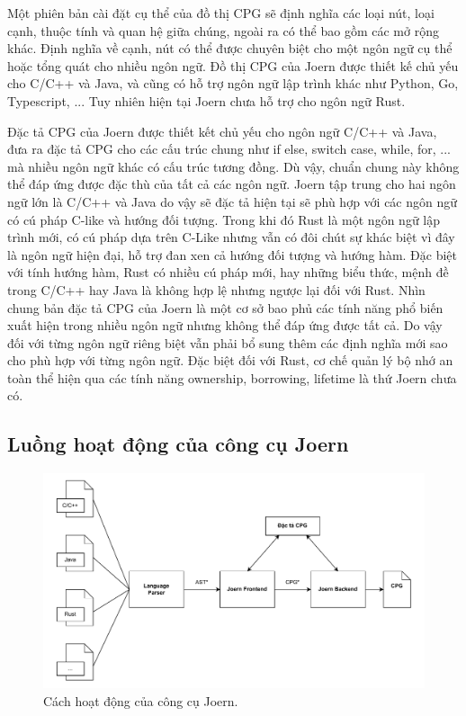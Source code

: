 Một phiên bản cài đặt cụ thể của đồ thị CPG sẽ định nghĩa các loại nút, loại cạnh, thuộc tính và quan hệ giữa chúng, ngoài ra có thể bao gồm các mở rộng khác.
Định nghĩa về cạnh, nút có thể được chuyên biệt cho một ngôn ngữ cụ thể hoặc tổng quát cho nhiều ngôn ngữ.
Đồ thị CPG của Joern được thiết kế chủ yếu cho C/C++ và Java, và cũng có hỗ trợ ngôn ngữ lập trình khác như Python, Go,  Typescript, ...
Tuy nhiên hiện tại Joern chưa hỗ trợ cho ngôn ngữ Rust.

Đặc tả CPG của Joern được thiết kết chủ yếu cho ngôn ngữ C/C++ và Java, đưa ra đặc tả CPG cho các cấu trúc chung như if else, switch case, while, for, ... mà nhiều ngôn ngữ khác có cấu trúc tương đồng.
Dù vậy, chuẩn chung này không thể đáp ứng được đặc thù của tất cả các ngôn ngữ.
Joern tập trung cho hai ngôn ngữ lớn là C/C++ và Java do vậy sẽ đặc tả hiện tại sẽ phù hợp với các ngôn ngữ có cú pháp C-like và hướng đối tượng.
Trong khi đó Rust là một ngôn ngữ lập trình mới, có cú pháp dựa trên C-Like nhưng vẫn có đôi chút sự khác biệt vì đây là ngôn ngữ hiện đại, hỗ trợ đan xen cả hướng đối tượng và hướng hàm.
Đặc biệt với tính hướng hàm, Rust có nhiều cú pháp mới, hay những biểu thức, mệnh đề trong C/C++ hay Java là không hợp lệ nhưng ngược lại đối với Rust.
Nhìn chung bản đặc tả CPG của Joern là một cơ sở bao phủ các tính năng phổ biến xuất hiện trong nhiều ngôn ngữ nhưng không thể đáp ứng được tất cả.
Do vậy đối với từng ngôn ngữ riêng biệt vẫn phải bổ sung thêm các định nghĩa mới sao cho phù hợp với từng ngôn ngữ.
Đặc biệt đối với Rust, cơ chế quản lý bộ nhớ an toàn thể hiện qua các tính năng ownership, borrowing, lifetime là thứ Joern chưa có.

\subsection{Luồng hoạt động của công cụ Joern}
\label{sec:joern_flow}

\begin{figure}[H]
  \includegraphics[width=1\columnwidth]{figures/c2/c2_frontend_backend.drawio.pdf}
  \centering
  \caption{Cách hoạt động của công cụ Joern.}
  \label{img:c2_frontend_backend}
\end{figure}

